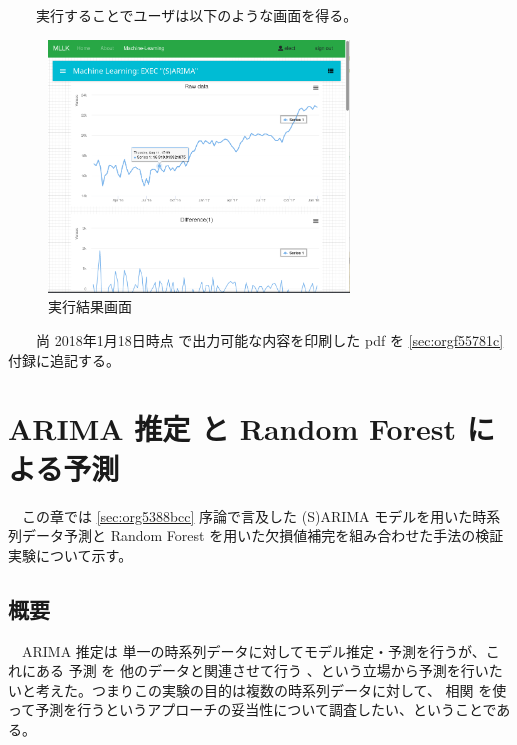 \documentclass{scrartcl}
\begin{document}
　　実行することでユーザは以下のような画面を得る。\\
\begin{figure}[htbp]
\centering
\includegraphics[width=8cm]{./arima-view.PNG}
\caption{実行結果画面}
\end{figure}

　　尚 2018年1月18日時点 で出力可能な内容を印刷した pdf を \ref{sec:orgf55781c} 付録に追記する。\\
\section{ARIMA 推定 と Random Forest による予測}
\label{sec:org26d20d0}
　この章では \ref{sec:org5388bcc} 序論で言及した (S)ARIMA モデルを用いた時系列データ予測と Random Forest を用いた欠損値補完を組み合わせた手法の検証実験について示す。\\
\subsection{概要}
\label{sec:orga756cba}

　ARIMA 推定は 単一の時系列データに対してモデル推定・予測を行うが、これにある 予測 を 他のデータと関連させて行う 、という立場から予測を行いたいと考えた。つまりこの実験の目的は複数の時系列データに対して、 相関 を使って予測を行うというアプローチの妥当性について調査したい、ということである。\\
\end{document}
